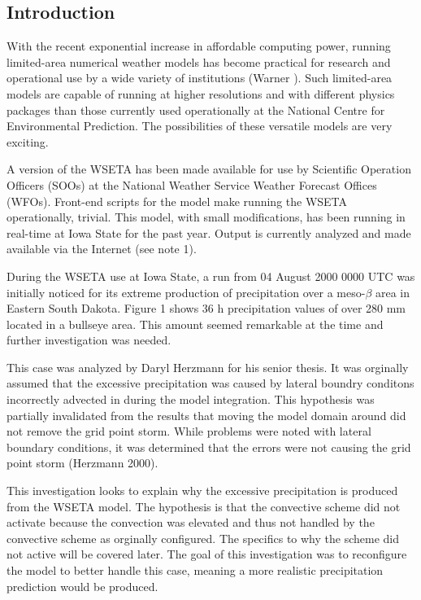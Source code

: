 \documentclass{article}
\begin{document}
\begin{multicols}{2}

\section{Introduction}
With the recent exponential increase in affordable computing power, running limited-area numerical
weather models has become practical for research and operational use by a wide variety of institutions
(Warner ).  Such limited-area models are capable of running at higher resolutions and with different physics packages than those currently used operationally at the National Centre for Environmental Prediction.  The possibilities of these versatile models are very exciting.

A version of the WSETA has been made available for use by Scientific Operation Officers (SOOs) at the National Weather Service Weather Forecast Offices (WFOs).  Front-end scripts for the model make running the WSETA operationally, trivial.  This model, with small modifications, has been running in real-time at Iowa State for the past year.  Output is currently analyzed and made available via the Internet (see note 1).

During the WSETA use at Iowa State, a run from 04 August 2000 0000 UTC was initially noticed for its extreme production of precipitation over a meso-$\beta$ area in Eastern South Dakota. Figure 1 shows 36 h precipitation values of over 280 mm located in a bullseye area.  This amount seemed remarkable at the time and further investigation was needed.

This case was analyzed by Daryl Herzmann for his senior thesis.  It was orginally assumed that the excessive precipitation was caused by lateral boundry conditons incorrectly advected in during the model integration.  This hypothesis was partially invalidated from the results that moving the model domain around did not remove the grid point storm.  While problems were noted with lateral boundary conditions, it was determined that the errors were not causing the grid point storm (Herzmann 2000).

This investigation looks to explain why the excessive precipitation is produced from the WSETA model.  The hypothesis is that the convective scheme did not activate because the convection was elevated and thus not handled by the convective scheme as orginally configured.  The specifics to why the scheme did not active will be covered later.  The goal of this investigation was to reconfigure the model to better handle this case, meaning a more realistic precipitation prediction would be produced.


\end{multicols}
\end{document}
